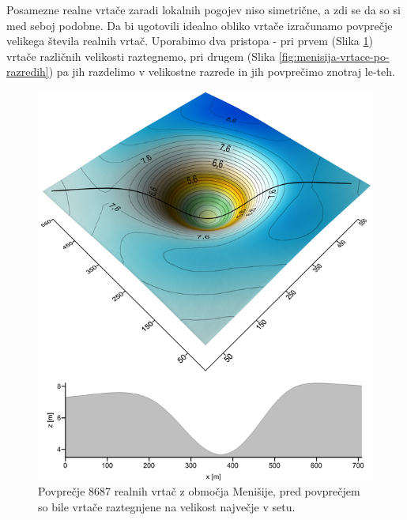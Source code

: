 \documentclass[a4paper, oneside, 12pt]{book}
\begin{document}
Posamezne realne vrtače zaradi lokalnih pogojev niso simetrične, a zdi se da so si med seboj podobne. Da bi ugotovili idealno obliko vrtače izračunamo povprečje velikega števila realnih vrtač. Uporabimo dva pristopa - pri prvem (Slika \ref{fig:menisija-vrtaca}) vrtače različnih velikosti raztegnemo, pri drugem (Slika \ref{fig:menisija-vrtace-po-razredih}) pa jih razdelimo v velikostne razrede in jih povprečimo znotraj le-teh. 

\begin{figure}[H]
  \centering
  \includegraphics[width=13cm]{slike/menisija-vrtaca}
  \caption{Povprečje 8687 realnih vrtač z območja Menišije, pred povprečjem so bile vrtače raztegnjene na velikost največje v setu.}
  \label{fig:menisija-vrtaca}
\end{figure}
\end{document}
